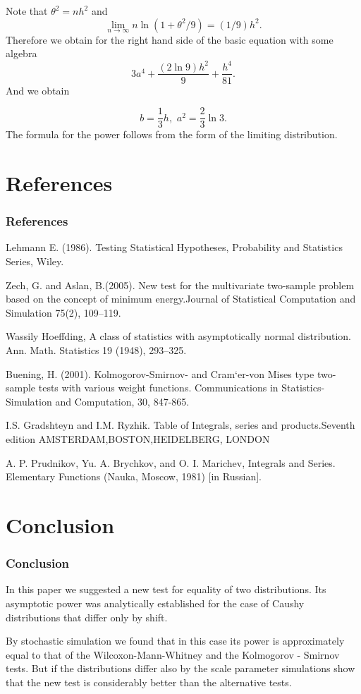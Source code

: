 \documentclass[slidestop,usepdftitle=false]{beamer}
\begin{document}
\begin{slide}
Note that $\theta^2=nh^2$ and
$$
\lim_{n\to \infty} n \ln(1+ \theta^2/9)= (1/9)h^2.
$$
Therefore we obtain for the right hand side of the basic equation with some algebra
\begin{equation*}
3a^4 + \frac{(2\ln 9 )h^2}{9} + \frac{h^4}{81}.
 \end{equation*}
 And we obtain

$$
b=\frac{1}{3} h,\,\,a^2=\frac{2}{3}\ln 3.
$$
The formula for the power follows from the form of the limiting distribution.
\end{slide}
\section{References}
\begin{slide}
\frametitle{References}
 Lehmann E. (1986).  Testing  Statistical  Hypotheses,  Probability  and  Statistics  Series,  Wiley.

Zech,  G. and Aslan, B.(2005).   New test for the multivariate two-sample problem based on the concept of minimum energy.Journal of Statistical Computation and Simulation 75(2), 109–119.

 Wassily Hoeffding, A class of statistics with asymptotically normal distribution.
Ann. Math. Statistics 19 (1948), 293–325.

Buening, H. (2001). Kolmogorov-Smirnov- and Cram`er-von Mises type two-sample tests with various weight functions. Communications in Statistics-
Simulation and Computation, 30, 847-865.
\end{slide}
\begin{slide}
I.S. Gradshteyn and I.M. Ryzhik. Table of Integrals, series and products.Seventh edition AMSTERDAM,BOSTON,HEIDELBERG, LONDON



A. P. Prudnikov, Yu. A. Brychkov, and O. I. Marichev, Integrals and Series. Elementary Functions (Nauka, Moscow, 1981) [in Russian].
\end{slide}
\section{Conclusion}
\begin{slide}
\frametitle{Conclusion}
In this paper we suggested a new test for equality of two distributions. Its asymptotic power was analytically established for the case of Caushy distributions that differ only by shift.

\bigskip
By stochastic simulation we found that in this case its power is approximately equal to that of the Wilcoxon-Mann-Whitney and the
Kolmogorov - Smirnov tests. But if the distributions differ also by the scale parameter simulations show that the new test is considerably better than the alternative tests.
\end{slide}
\end{document}
